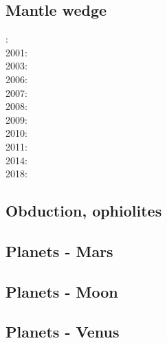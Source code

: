 \subsection*{Mantle wedge}

: \cite{tosl78}\\
2001: \cite{bigu01}\cite{haki01}\\
2003: \cite{vank03}\\
2006: \cite{gogc06}\cite{gecy06}\\
2007: \cite{gogc07}\cite{knvk07}\\
2008: \cite{knva08}\cite{cage08}\\
2009: \cite{leki09}\\
2010: \cite{roms10}\cite{hogz10}\\
2011: \cite{zhgh11}\\
2014: \cite{ledg14}\\
2018: \cite{pltv18}

\subsection*{Obduction, ophiolites}
 

\noindent
\cite{hack90}
\cite{hack91}
\cite{agzf14}

\subsection*{Planets - Mars}

\cite{scbg90}
\cite{nist01}
\cite{lenm04}
\cite{vavv05}
\cite{keta09}
\cite{gokg11}
\cite{ruts13}
\cite{seki14}
\cite{zhon16}

\subsection*{Planets - Moon}

\cite{zhdv19}

\subsection*{Planets - Venus}

